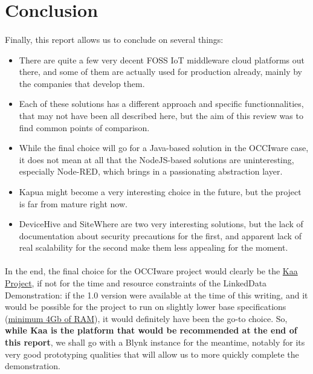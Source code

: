 \documentclass{article}
\begin{document}
\newpage

\section*{Conclusion}
%

\paragraph{} Finally, this report allows us to conclude on several things:

\begin{itemize}
\item There are quite a few very decent FOSS IoT middleware cloud platforms out there, and some of them are actually used for production already, mainly by the companies that develop them.
\item Each of these solutions has a different approach and specific functionnalities, that may not have been all described here, but the aim of this review was to find common points of comparison.
\item While the final choice will go for a Java-based solution in the OCCIware case, it does not mean at all that the NodeJS-based solutions are uninteresting, especially Node-RED, which brings in a passionating abstraction layer.
\item Kapua might become a very interesting choice in the future, but the project is far from mature right now.
\item DeviceHive and SiteWhere are two very interesting solutions, but the lack of documentation about security precautions for the first, and apparent lack of real scalability for the second make them less appealing for the moment.
\end{itemize}

\paragraph{} In the end, the final choice for the OCCIware project would clearly be the \href{https://www.kaaproject.org/}{Kaa Project}, if not for the time and resource constraints of the LinkedData Demonstration: if the 1.0 version were available at the time of this writing, and it would be possible for the project to run on slightly lower base specifications (\href{https://kaaproject.github.io/kaa/docs/v0.10.0/Getting-started/#sandbox-installation}{minimum 4Gb of RAM}), it would definitely have been the go-to choice. So, \textbf{while Kaa is the platform that would be recommended at the end of this report}, we shall go with a Blynk instance for the meantime, notably for its very good prototyping qualities that will allow us to more quickly complete the demonstration.
\end{document}
